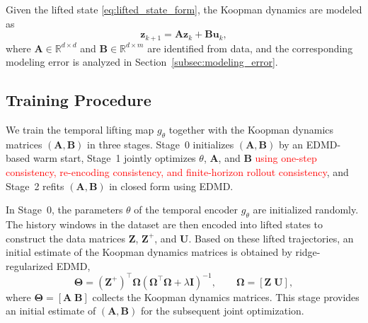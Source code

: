 \documentclass[journal]{IEEEtran}
\newcommand{\vu}{\mathbf{u}}
\newcommand{\vz}{\mathbf{z}}
\newcommand{\mA}{\mathbf{A}}
\newcommand{\mB}{\mathbf{B}}
\newcommand{\mZ}{\mathbf{Z}}
\newcommand{\mU}{\mathbf{U}}
\newcommand{\mI}{\mathbf{I}}
\newcommand{\mTheta}{\boldsymbol{\Theta}}
\newcommand{\mOmega}{\boldsymbol{\Omega}}
\begin{document}
Given the lifted state \eqref{eq:lifted_state_form}, the Koopman dynamics are modeled as
\begin{equation}
    \vz_{k+1} = \mA \vz_k + \mB \vu_k,
    \label{eq:temporal_dynamics}
\end{equation}
where $\mA \in \mathbb{R}^{d\times d}$ and $\mB \in \mathbb{R}^{d\times m}$ are identified from data, and the corresponding modeling error is analyzed in Section~\ref{subsec:modeling_error}.

\subsection{Training Procedure}
\label{sec:training}

We train the temporal lifting map $g_\theta$ together with the Koopman dynamics matrices $(\mA,\mB)$ in three stages. Stage~0 initializes $(\mA,\mB)$ by an EDMD-based warm start, Stage~1 jointly optimizes $\theta$, $\mA$, and $\mB$ \textcolor{red}{using one-step consistency, re-encoding consistency, and finite-horizon rollout consistency}, and Stage~2 refits $(\mA,\mB)$ in closed form using EDMD.

In Stage~0, the parameters $\theta$ of the temporal encoder $g_\theta$ are initialized randomly. The history windows in the dataset are then encoded into lifted states to construct the data matrices $\mZ$, $\mZ^{+}$, and $\mU$. Based on these lifted trajectories, an initial estimate of the Koopman dynamics matrices is obtained by ridge-regularized EDMD,
\begin{equation}
    \mTheta = (\mZ^{+})^\top \mOmega
    \left(\mOmega^\top \mOmega + \lambda \mI\right)^{-1},
    \qquad
    \mOmega = [\mZ\;\mU],
    \label{eq:edmd_solution}
\end{equation}
where $\mTheta = [\mA\;\mB]$ collects the Koopman dynamics matrices. This stage provides an initial estimate of $(\mA,\mB)$ for the subsequent joint optimization.
\end{document}
